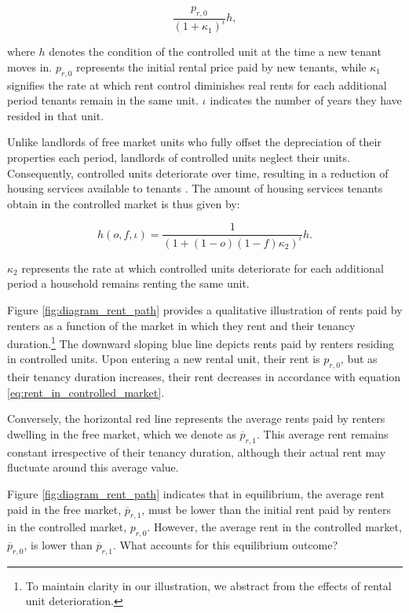 \documentclass[parskip=full]{article}
\begin{document}
\begin{equation}\label{eq:rent_in_controlled_market}
\frac{p_{r,0}}{(1+\kappa_{1})^{\iota}} h,
\end{equation} 

\noindent where $h$ denotes the condition of the controlled unit at the time a new tenant moves in. $p_{r,0}$ represents the initial rental price paid by new tenants, while $\kappa_{1}$ signifies the rate at which rent control diminishes real rents for each additional period tenants remain in the same unit. $\iota$ indicates the number of years they have resided in that unit.

Unlike landlords of free market units who fully offset the depreciation of their properties each period, landlords of controlled units neglect their units. Consequently, controlled units deteriorate over time, resulting in a reduction of housing services available to tenants \citep{gl-1990,la-2018}. The amount of housing services tenants obtain in the controlled market is thus given by:

\begin{equation}
    h(o,f,\iota)=\frac{1}{(1+(1-o)(1-f)\kappa_{2})^{\iota}} h.
\end{equation}
 
\noindent $\kappa_{2}$ represents the rate at which controlled units deteriorate for each additional period a household remains renting the same unit.

Figure \ref{fig:diagram_rent_path} provides a qualitative illustration of rents paid by renters as a function of the market in which they rent and their tenancy duration.\footnote{To maintain clarity in our illustration, we abstract from the effects of rental unit deterioration.} The downward sloping blue line depicts rents paid by renters residing in controlled units. Upon entering a new rental unit, their rent is $p_{r,0}$, but as their tenancy duration increases, their rent decreases in accordance with equation \eqref{eq:rent_in_controlled_market}.

Conversely, the horizontal red line represents the average rents paid by renters dwelling in the free market, which we denote as $\overline{p}_{r,1}$. This average rent remains constant irrespective of their tenancy duration, although their actual rent may fluctuate around this average value.

Figure \ref{fig:diagram_rent_path} indicates that in equilibrium, the average rent paid in the free market, $\overline{p}_{r,1}$, must be lower than the initial rent paid by renters in the controlled market, $p_{r,0}$. However, the average rent in the controlled market, $\overline{p}_{r,0}$, is lower than $\overline{p}_{r,1}$. What accounts for this equilibrium outcome?
\end{document}
